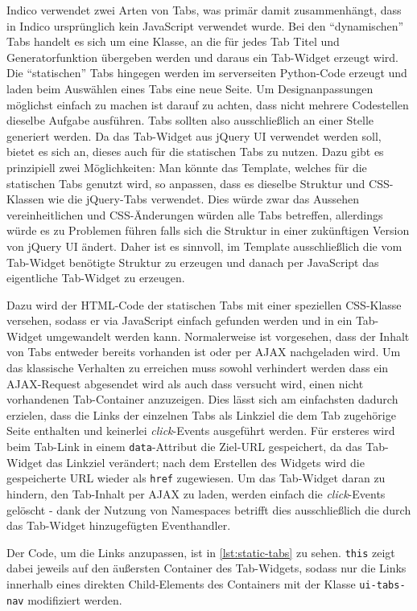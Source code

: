 Indico verwendet zwei Arten von Tabs, was primär damit zusammenhängt, dass in Indico ursprünglich
kein JavaScript verwendet wurde. Bei den \enquote{dynamischen} Tabs handelt es sich um eine Klasse,
an die für jedes Tab Titel und Generatorfunktion übergeben werden und daraus ein Tab-Widget erzeugt
wird. Die \enquote{statischen} Tabs hingegen werden im serverseiten Python-Code erzeugt und laden
beim Auswählen eines Tabs eine neue Seite. Um Designanpassungen möglichst einfach zu machen ist
darauf zu achten, dass nicht mehrere Codestellen dieselbe Aufgabe ausführen. Tabs sollten
also ausschließlich an einer Stelle generiert werden. Da das Tab-Widget aus jQuery UI verwendet
werden soll, bietet es sich an, dieses auch für die statischen Tabs zu nutzen. Dazu gibt es
prinzipiell zwei Möglichkeiten: Man könnte das Template, welches für die statischen Tabs genutzt
wird, so anpassen, dass es dieselbe Struktur und CSS-Klassen wie die jQuery-Tabs verwendet. Dies
würde zwar das Aussehen vereinheitlichen und CSS-Änderungen würden alle Tabs betreffen, allerdings
würde es zu Problemen führen falls sich die Struktur in einer zukünftigen Version von jQuery UI
ändert. Daher ist es sinnvoll, im Template ausschließlich die vom Tab-Widget benötigte Struktur zu
erzeugen und danach per JavaScript das eigentliche Tab-Widget zu erzeugen.

Dazu wird der HTML-Code der statischen Tabs mit einer speziellen CSS-Klasse versehen, sodass er via
JavaScript einfach gefunden werden und in ein Tab-Widget umgewandelt werden kann. Normalerweise ist
vorgesehen, dass der Inhalt von Tabs entweder bereits vorhanden ist oder per AJAX nachgeladen wird.
Um das klassische Verhalten zu erreichen muss sowohl verhindert werden dass ein AJAX-Request
abgesendet wird als auch dass versucht wird, einen nicht vorhandenen Tab-Container anzuzeigen. Dies
lässt sich am einfachsten dadurch erzielen, dass die Links der einzelnen Tabs als Linkziel die dem
Tab zugehörige Seite enthalten und keinerlei \emph{click}-Events ausgeführt werden. Für ersteres
wird beim Tab-Link in einem \lstinline{data}-Attribut die Ziel-URL gespeichert, da das Tab-Widget
das Linkziel verändert; nach dem Erstellen des Widgets wird die gespeicherte URL wieder als
\lstinline{href} zugewiesen. Um das Tab-Widget daran zu hindern, den Tab-Inhalt per AJAX zu laden,
werden einfach die \emph{click}-Events gelöscht - dank der Nutzung von Namespaces betrifft dies
ausschließlich die durch das Tab-Widget hinzugefügten Eventhandler.

Der Code, um die Links anzupassen, ist in \autoref{lst:static-tabs} zu sehen. \lstinline{this} zeigt
dabei jeweils auf den äußersten Container des Tab-Widgets, sodass nur die Links innerhalb eines
direkten Child-Elements des Containers mit der Klasse \lstinline{ui-tabs-nav} modifiziert werden.

